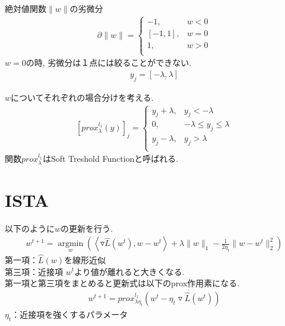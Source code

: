 \documentclass[dvipdfmx]{beamer}
\begin{document}
\begin{frame}
    絶対値関数$\|w\|$の劣微分
    \begin{eqnarray}
        \partial \|w\| = \begin{cases}
            -1,  & w < 0 \\
            \left[ -1, 1\right],  & w = 0 \\
            1,  & w > 0 \\
        \end{cases}
    \end{eqnarray}
    $w = 0$の時, 劣微分は１点には絞ることができない.
    \begin{eqnarray}
        y_j = \left[ -\lambda, \lambda \right]
    \end{eqnarray}
\end{frame}

\begin{frame}
    $w$についてそれぞれの場合分けを考える.
    \begin{eqnarray}
        \left[ prox_{\lambda}^{l_1} (y) \right]_j = \begin{cases}
            y_j + \lambda, & y_j < - \lambda \\
            0, & -\lambda \le y_j \le \lambda \\
            y_j - \lambda, & y_j > \lambda \\
        \end{cases}
    \end{eqnarray}
    関数$prox_{\lambda}^{l_1}$はSoft Treshold Functionと呼ばれる.
\end{frame}

\section{ISTA}
\begin{frame}
    以下のように$w$の更新を行う.
    \begin{eqnarray}
        w^{t+1} = \underset{w}{ \operatorname{argmin}} \left( \left< \triangledown \hat{L}(w^t), w - w^t \right> + \lambda \|w\|_1 - \frac{1}{2\eta_t} \|w - w^t\|^2_2 \right)
    \end{eqnarray}
    第一項：$\hat{L}(w)$を線形近似 \\
    第三項：近接項 $w^t$より値が離れると大きくなる. \\
    第一項と第三項をまとめると更新式は以下のprox作用素になる.  
    \begin{eqnarray}
        w^{t+1} = prox_{\lambda \eta_t}^{l_1} \left( w^t - \eta_t \triangledown \hat{L}(w^t) \right)
    \end{eqnarray}
    $\eta_t$：近接項を強くするパラメータ
\end{frame}
\end{document}
